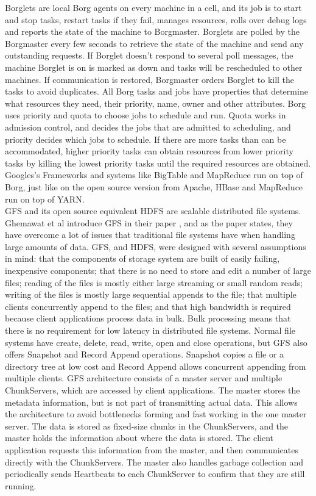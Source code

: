 \documentclass{article}
\theoremstyle{definition}
\begin{document}
Borglets are local Borg agents on every machine in a cell, and its job is to start and stop tasks, restart tasks if they fail, manages resources, rolls over debug logs and reports the state of the machine to Borgmaster. Borglets are polled by the Borgmaster every few seconds to retrieve the state of the machine and send any outstanding requests. If Borglet doesn't respond to several poll messages, the machine Borglet is on is marked as down and tasks will be rescheduled to other machines. If communication is restored, Borgmaster orders Borglet to kill the tasks to avoid duplicates.
All Borg tasks and jobs have properties that determine what resources they need, their priority, name, owner and other attributes. 
Borg uses priority and quota to choose jobs to schedule and run. Quota works in admission control, and decides the jobs that are admitted to scheduling, and priority decides which jobs to schedule. If there are more tasks than can be accommodated, higher priority tasks can obtain resources from lower priority tasks by killing the lowest priority tasks until the required resources are obtained. 
Googles's Frameworks and systems like BigTable and MapReduce run on top of Borg, just like on the open source version from Apache, HBase and MapReduce run on top of YARN. \\

GFS and its open source equivalent HDFS are scalable distributed file systems. Ghemawat et al introduce GFS in their paper \cite{Ghemawat2003}, and as the paper states, they have overcome a lot of issues that traditional file systems have when handling large amounts of data. GFS, and HDFS, were designed with several assumptions in mind: that the components of storage system are built of easily failing, inexpensive components; that there is no need to store and edit a number of large files; reading of the files is mostly either large streaming or small random reads; writing of the files is mostly large sequential appends to the file; that multiple clients concurrently append to the files; and that high bandwidth is required because client applications process data in bulk. Bulk processing means that there is no requirement for low latency in distributed file systems. Normal file systems have create, delete, read, write, open and close operations, but GFS also offers Snapshot and Record Append operations. Snapshot copies a file or a directory tree at low cost and Record Append allows concurrent appending from multiple clients.   
GFS architecture consists of a master server and multiple ChunkServers, which are accessed by client applications. The master stores the metadata information, but is not part of transmitting actual data. This allows the architecture to avoid bottlenecks forming and fast working in the one master server. The data is stored as fixed-size chunks in the ChunkServers, and the master holds the information about where the data is stored. The client application requests this information from the master, and then communicates directly with the ChunkServers. The master also handles garbage collection and periodically sends Heartbeats to each ChunkServer to confirm that they are still running.  \\
\end{document}
